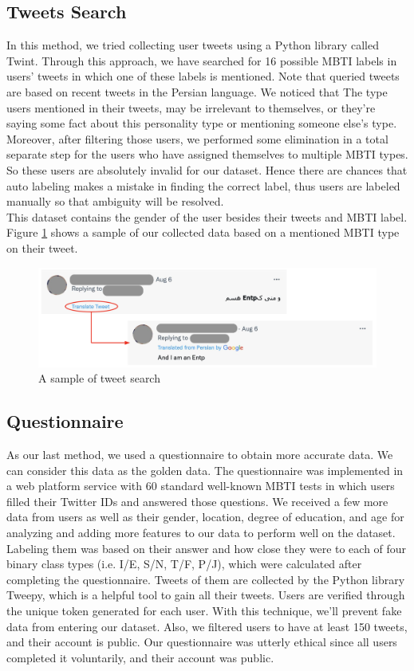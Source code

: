 \documentclass[10pt, a4paper]{article}
\begin{document}
\subsection{Tweets Search}
In this method, we tried collecting user tweets using a Python library called Twint.
Through this approach, we have searched for 16 possible MBTI labels in users' tweets in which one of these labels is mentioned.
Note that queried tweets are based on recent tweets in the Persian language.
We noticed that The type users mentioned in their tweets, may be irrelevant to themselves,
or they're saying some fact about this personality type or mentioning someone else's type.
Moreover, after filtering those users, we performed some elimination in a total separate step for the users
who have assigned themselves to multiple MBTI types. So these users are absolutely invalid for our dataset.
Hence there are chances that auto labeling makes a mistake in finding the correct label,
thus users are labeled manually so that ambiguity will be resolved.
\\
This dataset contains the gender of the user besides their tweets and MBTI label.
Figure \ref{tweet_figure} shows a sample of our collected data based on a mentioned MBTI type on their tweet.

\begin{figure}[h]
    \centering
    \includegraphics[width=.95\columnwidth]{images/sample-tweet.png}
    \caption{A sample of tweet search}
    \label{tweet_figure}
\end{figure}

\subsection{Questionnaire}
As our last method, we used a questionnaire to obtain more accurate data.
We can consider this data as the golden data.
The questionnaire was implemented in a web platform service with 60 standard well-known MBTI tests in which users
filled their Twitter IDs and answered those questions. We received a
few more data from users as well as their gender, location, degree of education,
and age for analyzing and adding more features to our data to perform well on the dataset.
Labeling them was based on their answer and how close they were to each of four binary class types (i.e. I/E, S/N, T/F, P/J),
which were calculated after completing the questionnaire.
Tweets of them are collected by the Python library Tweepy, which is a helpful tool to gain all their tweets.
Users are verified through the unique token generated for each user.
With this technique, we'll prevent fake data from entering our dataset.
Also, we filtered users to have at least 150 tweets, and their account is public.
Our questionnaire was utterly ethical since all users completed it voluntarily, and their account was public.
\end{document}
